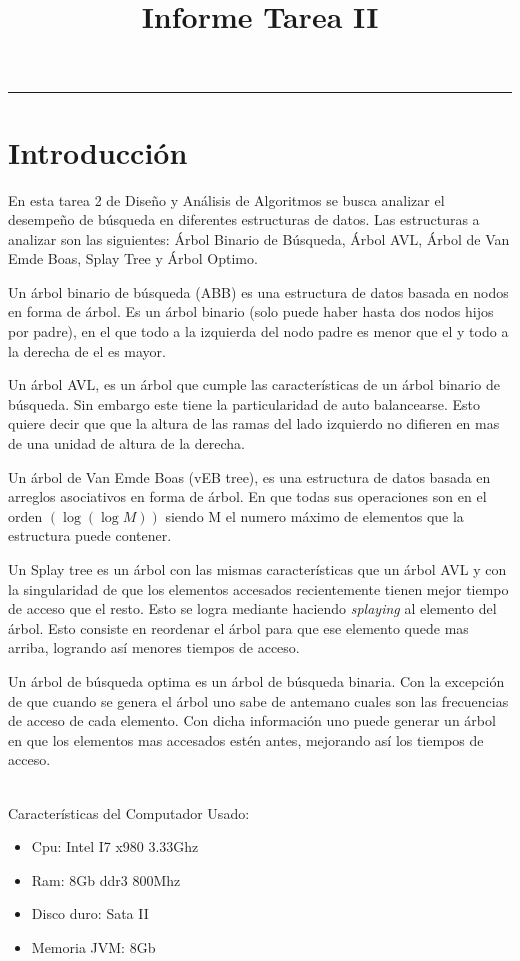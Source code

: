 \documentclass[letterpaper,12pt]{article}
\title{Informe Tarea II}
\makeatletter
\renewcommand{\maketitle}{\begin{titlepage}%
    \let\footnotesize\small
    \let\footnoterule\relax
    \parindent \z@
    \reset@font
    \null\vfil
    \begin{flushleft}    
      \small \@curso \par
      \huge{\textbf{\@title}} \par
    \end{flushleft}
    \par
    \hrule height 4pt
    \par
    \begin{flushright}
      \Huge{\textbf{\@author}} \par
      \bigskip
      \normalsize{\@primerautor} \par
      \normalsize{\@segundoautor} \par
      \bigskip
      \bigskip
      \normalsize \@date \par
    \end{flushright}
    \vskip 60\p@
    \vfil\null
  \end{titlepage}%
  \setcounter{footnote}{0}%
}
\makeatother
\begin{document}
 
\maketitle
 
 
\newpage
\thispagestyle{empty}
\tableofcontents
\setcounter{page}{0}
\newpage
 
\section{Introducción}
En esta tarea 2 de Diseño y Análisis de Algoritmos se busca analizar el desempeño de búsqueda en diferentes estructuras de datos. Las estructuras a analizar son las siguientes: Árbol Binario de Búsqueda, Árbol AVL, Árbol de Van Emde Boas, Splay Tree y Árbol Optimo.
 
Un árbol binario de búsqueda (ABB) es una estructura de datos basada en nodos en forma de árbol. Es un árbol binario (solo puede haber hasta dos nodos hijos por padre), en el que todo a la izquierda del nodo padre es menor que el y todo a la derecha de el es mayor.

Un árbol AVL, es un árbol que cumple las características de un árbol binario de búsqueda. Sin embargo este tiene la particularidad de auto balancearse. Esto quiere decir que que la altura de las ramas del lado izquierdo no difieren en mas de una unidad de altura de la derecha.

Un árbol de Van Emde Boas (vEB tree), es una estructura de datos basada en arreglos asociativos en forma de árbol. En que todas sus operaciones son en el orden $(\log \left(\log M \right))$ siendo M el numero máximo de elementos que la estructura puede contener.

Un Splay tree es un árbol con las mismas características que un árbol AVL y con la singularidad de que los elementos accesados recientemente tienen mejor tiempo de acceso que el resto. Esto se logra mediante haciendo \textit{splaying} al elemento del árbol. Esto consiste en reordenar el árbol para que ese elemento quede mas arriba, logrando así menores tiempos de acceso. 

Un árbol de búsqueda optima es un árbol de búsqueda binaria. Con la excepción de que cuando se genera el árbol uno sabe de antemano cuales son las frecuencias de acceso de cada elemento. Con dicha información uno puede generar un árbol en que los elementos mas accesados estén antes, mejorando así los tiempos de acceso.

~\\
Características del Computador Usado:
\begin{itemize}
\item Cpu: Intel I7 x980 3.33Ghz
\item Ram: 8Gb ddr3 800Mhz
\item Disco duro: Sata II
\item Memoria JVM: 8Gb
\end{itemize}
\newpage 
\end{document}
